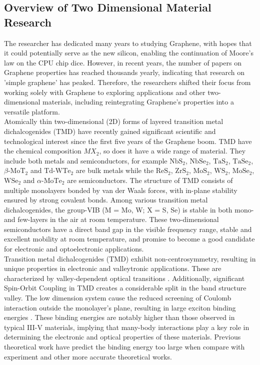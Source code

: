 \documentclass[12pt,english,a4paper]{article}
\begin{document}
	\subsection{Overview of Two Dimensional Material Research}
	\quad  The researcher has dedicated many years to studying Graphene, with hopes that it could potentially serve as the new silicon, enabling the continuation of Moore's law on the CPU chip dice. However, in recent years, the number of papers on Graphene properties has reached thousands yearly, indicating that research on 'simple graphene' has peaked. \cite{geim_van_2013} Therefore, the researchers shifted their focus from working solely with Graphene to exploring applications and other two-dimensional materials, including reintegrating Graphene's properties into a versatile platform.\\\null
	\quad Atomically thin two-dimensional (2D) forms of layered transition metal dichalcogenides (TMD) have recently gained significant scientific and technological interest since the first five years of the Graphene boom.\cite{wang_electronics_2012,geim_van_2013} TMD have the chemical composition $MX_2$, so does it have a wide range of material. They include both metals and semiconductors, for example $\mathrm{NbS}_2$, $\mathrm{NbSe}_2$, $\mathrm{TaS}_2$, $\mathrm{TaSe}_2$, $\beta$-$\mathrm{MoT}_2$ and $\mathrm{Td}$-$\mathrm{WTe}_2$ are bulk metals while the $\mathrm{ReS}_2$, $\mathrm{ZrS}_2$, $\mathrm{MoS}_2$, $\mathrm{WS}_2$, $\mathrm{MoSe}_2$, $\mathrm{WSe}_2$ and $\alpha$-$\mathrm{MoTe}_2$ are semiconductors. The structure of TMD consists of multiple monolayers bonded by van der Waals forces, with in-plane stability ensured by strong covalent bonds.
	Among various transition metal dichalcogenides, the group-VIB (M = Mo, W; X = S, Se) is stable in both mono- and few-layers in the air at room temperature.\cite{geim_van_2013} These two-dimensional semiconductors have a direct band gap in the visible frequency range, stable and excellent mobility at room temperature\cite{jiang_flexo-photovoltaic_2021, wang_electronics_2012}, and promise to become a good candidate for electronic and optoelectronic applications.\\\null
	\quad Transition metal dichalcogenides (TMD) exhibit non-centrosymmetry, resulting in unique properties in electronic and valleytronic applications. These are characterized by valley-dependent optical transitions \cite{xiao_valley-contrasting_2007,yao_valley-dependent_2008}. Additionally, significant Spin-Orbit Coupling in TMD creates a considerable split in the band structure valley. The low dimension system cause the reduced screening of Coulomb interaction outside the monolayer's plane, resulting in large exciton binding energies \cite{kirichenko_influence_2021, zhang_absorption_2014}. These binding energies are notably higher than those observed in typical III-V materials, implying that many-body interactions play a key role in determining the electronic and optical properties of these materials. Previous theoretical work have predict the binding energy too large\cite{ramasubramaniam_large_2012,qiu_optical_2013,cheiwchanchamnangij_quasiparticle_2012, shi_quasiparticle_2013} when compare with experiment\cite{zhang_absorption_2014} and other more accurate theoretical works\cite{zhang_absorption_2014, kirichenko_influence_2021}.
\end{document}

